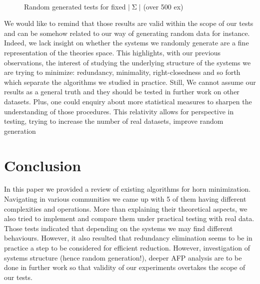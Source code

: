 \documentclass[runningheads]{llncs}
\DeclareMathOperator{\Sg}{\Sigma}  %
\begin{document}
\begin{figure}
	\begin{minipage}{0.4\textwidth}
		\hspace{-3em}
		\subfloat[Average time, $|\Sg| = 100$]{
			\scalebox{0.4}{}
		}
	\end{minipage}
	~
	\begin{minipage}{0.4\textwidth}
		\hspace{-1em}
		\subfloat[Average time, $|\Sg| = 500$]{
			\scalebox{0.4}{}	
		}
	\end{minipage}
	
	\caption{Random generated tests for fixed $|\Sg|$ (over 500 ex)}	
	
	\label{fig:random}
	
\end{figure}

We would like to remind that those results are valid within the scope of our tests and can be somehow related to our way of generating random data for instance. Indeed, we lack insight on whether the systems we randomly generate are a fine representation of the theories space. This highlights, with our previous observations, the interest of studying the underlying structure of the
systems we are trying to minimize: redundancy, minimality, right-closedness and so forth which separate the algorithms we studied in practice. Still, We cannot assume our results as a general truth and they should be tested in further work on other datasets. Plus, one could enquiry about more statistical measures to sharpen the understanding of those procedures. This relativity allows for perspective in testing, trying to increase the number of real datasets, improve random generation

\section{Conclusion}

In this paper we provided a review of existing algorithms for horn minimization.
Navigating in various communities we came up with 5 of them having different complexities and operations. More than explaining their theoretical aspects, we
also tried to implement and compare them under practical testing with real data. Those tests indicated that depending on the systems we may find different behaviours. However, it also resulted that redundancy elimination seems to be in practice a step to be considered for efficient reduction. However, investigation of systems structure (hence random generation!), deeper AFP analysis are to be done in further work so that validity of our experiments overtakes the scope of our tests.



\end{document}
